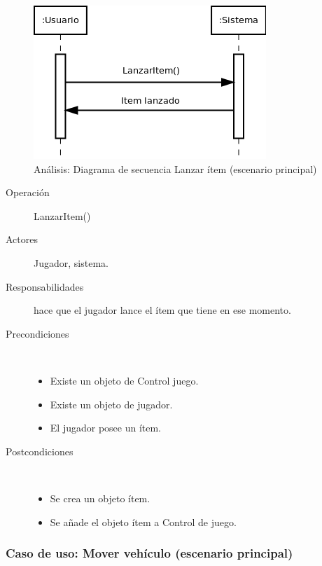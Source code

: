 \begin{figure}[H] 
  \label{secuencia_lanzar_item}
  \begin{center}
    \includegraphics[scale=0.7]{imagenes/analisis/secuencia_lanzar_item.png}
  \end{center}
  \caption{Análisis: Diagrama de secuencia Lanzar ítem (escenario principal)}
\end{figure}

\begin{description}
    \item [Operación] LanzarItem()
    \item [Actores] Jugador, sistema.
    \item [Responsabilidades] hace que el jugador lance el ítem que tiene en ese momento.
    \item [Precondiciones] $\quad$
        \begin{itemize}
            \item Existe un objeto de Control juego.
            \item Existe un objeto de jugador.
            \item El jugador posee un ítem.
        \end{itemize}
    \item [Postcondiciones] $\quad$
        \begin{itemize}
            \item Se crea un objeto ítem.
            \item Se añade el objeto ítem a Control de juego.
        \end{itemize}
\end{description}

\subsubsection{Caso de uso: Mover vehículo (escenario principal)}

